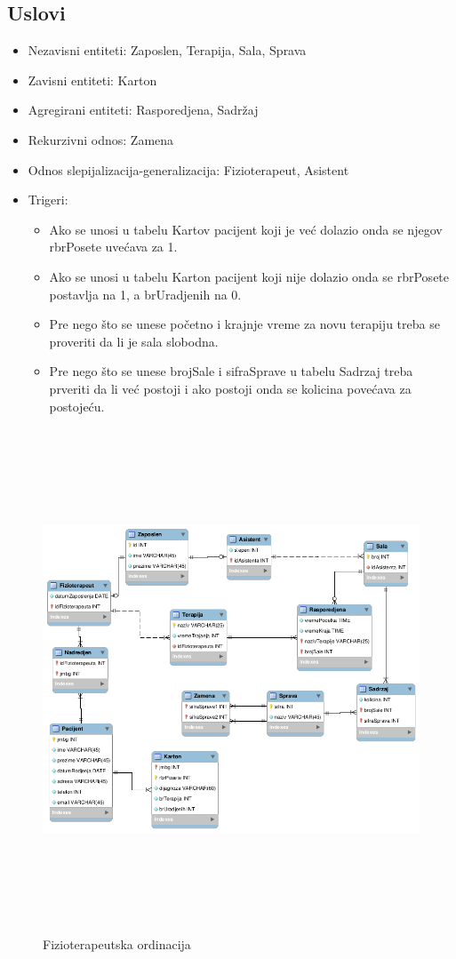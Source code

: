\documentclass{article}
\begin{document}
\subsection{Uslovi}
\begin{itemize}
	\item Nezavisni entiteti: Zaposlen, Terapija, Sala, Sprava
	\item Zavisni entiteti: Karton
	\item Agregirani entiteti: Rasporedjena, Sadržaj
	\item Rekurzivni odnos: Zamena
	\item Odnos slepijalizacija-generalizacija: Fizioterapeut, Asistent
	\item Trigeri: 
		\begin{itemize}
			\item Ako se unosi u tabelu Kartov pacijent koji je već dolazio onda se njegov rbrPosete uvećava za 1.
			\item Ako se unosi u tabelu Karton pacijent koji nije dolazio onda se rbrPosete postavlja na 1, a brUradjenih na 0.
			\item Pre nego što se unese početno i krajnje vreme za novu terapiju treba se proveriti da li je sala slobodna.
			\item Pre nego što se unese brojSale i sifraSprave u tabelu Sadrzaj treba prveriti da li već postoji i ako postoji onda se kolicina povećava za postojeću.
		\end{itemize}	
\end{itemize}

\begin{figure}[H]
	\centering
	\includegraphics[width=15cm,height=15cm,keepaspectratio]{EER.png}
	\caption{Fizioterapeutska ordinacija}
	\label{fig:dijagram}
\end{figure}
\end{document}
